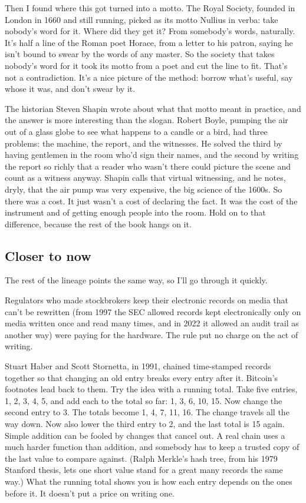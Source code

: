 \documentclass[11pt,twoside]{article}
\theoremstyle{thielethm}
\theoremstyle{thieledef}
\theoremstyle{thieledef}
\theoremstyle{thieledef}
\theoremstyle{thielethm}
\theoremstyle{thieleobs}
\theoremstyle{thielethm}
\begin{document}
Then I found where this got turned into a motto. The Royal Society, founded in London in 1660 and still running, picked as its motto Nullius in verba: take nobody's word for it. Where did they get it? From somebody's words, naturally. It's half a line of the Roman poet Horace, from a letter to his patron, saying he isn't bound to swear by the words of any master. So the society that takes nobody's word for it took its motto from a poet and cut the line to fit. That's not a contradiction. It's a nice picture of the method: borrow what's useful, say whose it was, and don't swear by it.

The historian Steven Shapin wrote about what that motto meant in practice, and the answer is more interesting than the slogan. Robert Boyle, pumping the air out of a glass globe to see what happens to a candle or a bird, had three problems: the machine, the report, and the witnesses. He solved the third by having gentlemen in the room who'd sign their names, and the second by writing the report so richly that a reader who wasn't there could picture the scene and count as a witness anyway. Shapin calls that virtual witnessing, and he notes, dryly, that the air pump was very expensive, the big science of the 1600s. So there was a cost. It just wasn't a cost of declaring the fact. It was the cost of the instrument and of getting enough people into the room. Hold on to that difference, because the rest of the book hangs on it.

\subsection{Closer to now}

The rest of the lineage points the same way, so I'll go through it quickly.

Regulators who made stockbrokers keep their electronic records on media that can't be rewritten (from 1997 the SEC allowed records kept electronically only on media written once and read many times, and in 2022 it allowed an audit trail as another way) were paying for the hardware. The rule put no charge on the act of writing.

Stuart Haber and Scott Stornetta, in 1991, chained time-stamped records together so that changing an old entry breaks every entry after it. Bitcoin's footnotes lead back to them. Try the idea with a running total. Take five entries, 1, 2, 3, 4, 5, and add each to the total so far: 1, 3, 6, 10, 15. Now change the second entry to 3. The totals become 1, 4, 7, 11, 16. The change travels all the way down. Now also lower the third entry to 2, and the last total is 15 again. Simple addition can be fooled by changes that cancel out. A real chain uses a much harder function than addition, and somebody has to keep a trusted copy of the last value to compare against. (Ralph Merkle's hash tree, from his 1979 Stanford thesis, lets one short value stand for a great many records the same way.) What the running total shows you is how each entry depends on the ones before it. It doesn't put a price on writing one.
\end{document}
